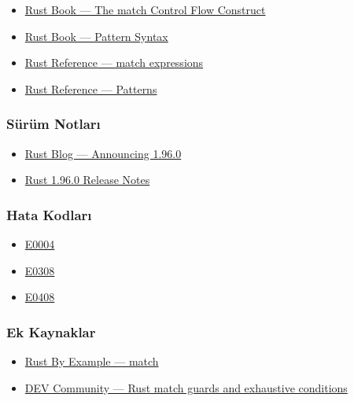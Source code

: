 \documentclass[12pt,a4paper]{article}
\begin{document}
\begin{itemize}
\tightlist
\item
  \href{https://doc.rust-lang.org/book/ch06-02-match.html}{Rust Book --- The match Control Flow Construct}
\item
  \href{https://doc.rust-lang.org/book/ch19-03-pattern-syntax.html}{Rust Book --- Pattern Syntax}
\item
  \href{https://doc.rust-lang.org/reference/expressions/match-expr.html}{Rust Reference --- match expressions}
\item
  \href{https://doc.rust-lang.org/reference/patterns.html}{Rust Reference --- Patterns}
\end{itemize}

\subsubsection{Sürüm Notları}\label{sürüm-notları-7}

\begin{itemize}
\tightlist
\item
  \href{https://blog.rust-lang.org/2026/05/28/Rust-1.96.0/}{Rust Blog --- Announcing 1.96.0}
\item
  \href{https://doc.rust-lang.org/stable/releases.html\#version-1960-2026-05-28}{Rust 1.96.0 Release Notes}
\end{itemize}

\subsubsection{Hata Kodları}\label{hata-kodları-7}

\begin{itemize}
\tightlist
\item
  \href{https://doc.rust-lang.org/error_codes/E0004.html}{E0004}
\item
  \href{https://doc.rust-lang.org/error_codes/E0308.html}{E0308}
\item
  \href{https://doc.rust-lang.org/error_codes/E0408.html}{E0408}
\end{itemize}

\subsubsection{Ek Kaynaklar}\label{ek-kaynaklar-7}

\begin{itemize}
\tightlist
\item
  \href{https://doc.rust-lang.org/rust-by-example/flow_control/match.html}{Rust By Example --- match}
\item
  \href{https://dev.to/mark_saward/rust-match-guards-and-exhaustive-conditions-ad2}{DEV Community --- Rust match guards and exhaustive conditions}
\end{itemize}
\end{document}
